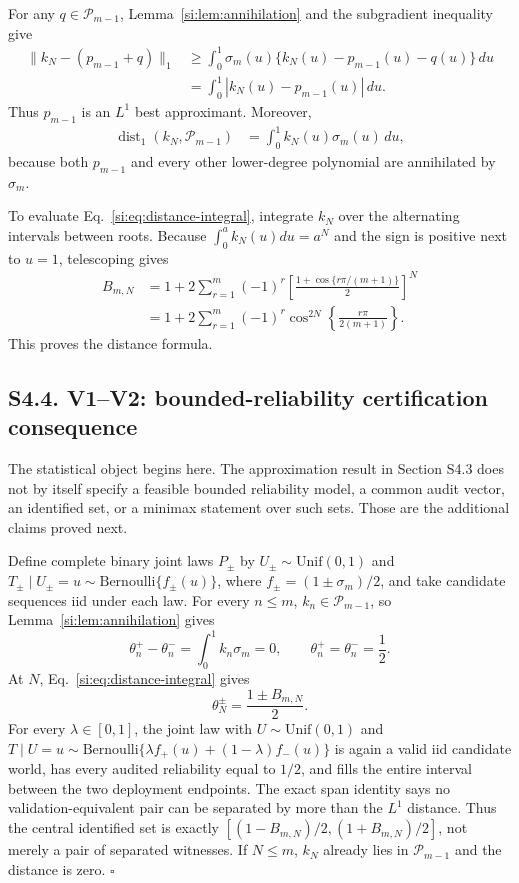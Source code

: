 \documentclass[10pt,twocolumn]{article}
\newcommand{\cP}{\mathcal P}
\newcommand{\dist}{\operatorname{dist}}
\begin{document}
For any $q\in\cP_{m-1}$, Lemma~\ref{si:lem:annihilation} and the subgradient inequality give
\begin{align}
\|k_N-(p_{m-1}+q)\|_1
&\ge\int_0^1\sigma_m(u)\{k_N(u)-p_{m-1}(u)-q(u)\}\,du\nonumber\\
&=\int_0^1|k_N(u)-p_{m-1}(u)|\,du.
\label{si:eq:l1-optimality}
\end{align}
Thus $p_{m-1}$ is an $L^1$ best approximant. Moreover,
\begin{align}
\dist_1(k_N,\cP_{m-1})
&=\int_0^1k_N(u)\sigma_m(u)\,du,
\label{si:eq:distance-integral}
\end{align}
because both $p_{m-1}$ and every other lower-degree polynomial are annihilated by $\sigma_m$.

To evaluate Eq.~\ref{si:eq:distance-integral}, integrate $k_N$ over the alternating intervals between roots. Because $\int_0^a k_N(u)du=a^N$ and the sign is positive next to $u=1$, telescoping gives
\begin{align}
B_{m,N}
&=1+2\sum_{r=1}^m(-1)^r
\left[\frac{1+\cos\{r\pi/(m+1)\}}2\right]^N\nonumber\\
&=1+2\sum_{r=1}^m(-1)^r
\cos^{2N}\!\left\{\frac{r\pi}{2(m+1)}\right\}.
\label{si:eq:closed-form}
\end{align}
This proves the distance formula.

\subsection*{S4.4. V1--V2: bounded-reliability certification consequence}

The statistical object begins here. The approximation result in Section S4.3 does not by itself specify a feasible bounded reliability model, a common audit vector, an identified set, or a minimax statement over such sets. Those are the additional claims proved next.

Define complete binary joint laws $P_\pm$ by $U_\pm\sim\mathrm{Unif}(0,1)$ and
$T_\pm\mid U_\pm=u\sim\mathrm{Bernoulli}\{f_\pm(u)\}$, where
$f_\pm=(1\pm\sigma_m)/2$, and take candidate sequences iid under each law.
For every $n\le m$, $k_n\in\cP_{m-1}$, so Lemma~\ref{si:lem:annihilation} gives
\begin{equation}
\theta_n^+-\theta_n^-=\int_0^1k_n\sigma_m=0,
\qquad
\theta_n^+=\theta_n^-=\frac12.
\label{si:eq:audit-agreement}
\end{equation}
At $N$, Eq.~\ref{si:eq:distance-integral} gives
\begin{equation}
\theta_N^\pm=\frac{1\pm B_{m,N}}2.
\label{si:eq:deployment-separation}
\end{equation}
For every $\lambda\in[0,1]$, the joint law with $U\sim\mathrm{Unif}(0,1)$ and
$T\mid U=u\sim\mathrm{Bernoulli}\{\lambda f_+(u)+(1-\lambda)f_-(u)\}$ is
again a valid iid candidate world, has every audited reliability equal to
$1/2$, and fills the entire interval between the two deployment endpoints.
The exact span identity says no validation-equivalent pair can be separated
by more than the $L^1$ distance. Thus the central identified set is exactly
$[(1-B_{m,N})/2,(1+B_{m,N})/2]$, not merely a pair of separated witnesses. If
$N\le m$, $k_N$ already lies in $\cP_{m-1}$ and the distance is zero.
\hfill$\square$
\end{document}
